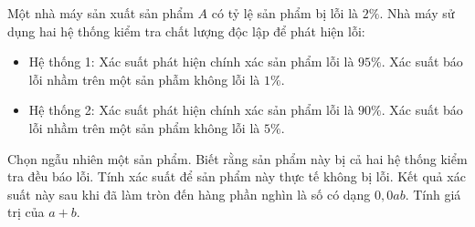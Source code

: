 \begin{bt}%
	Một nhà máy sản xuất sản phẩm $A$ có tỷ lệ sản phẩm bị lỗi là $2\%$. Nhà máy sử dụng hai hệ thống kiểm tra chất lượng độc lập để phát  hiện lỗi:
	\begin{itemize}
		\item Hệ thống 1: Xác suất phát hiện chính xác sản phẩm lỗi là $95\%$. Xác  suất báo lỗi nhầm trên một sản phẫm không lỗi là $1\%$.
		 \item Hệ thống 2: Xác suất phát hiện chính xác sản phẩm lỗi là $90\%$. Xác suất báo lỗi nhầm trên một sản phẩm không lỗi là $5\%$.
	\end{itemize}
	Chọn ngẫu nhiên một sản phẩm. Biết rằng sản phẩm này bị cả hai hệ thống kiểm tra đều báo lỗi. Tính xác suất để sản phẩm  này thực tế không bị lỗi. Kết quả xác suất này sau khi đã làm tròn đến hàng phần nghìn là số có dạng $0{,}0ab$. Tính giá trị của $a+b$. 
\end{bt}

